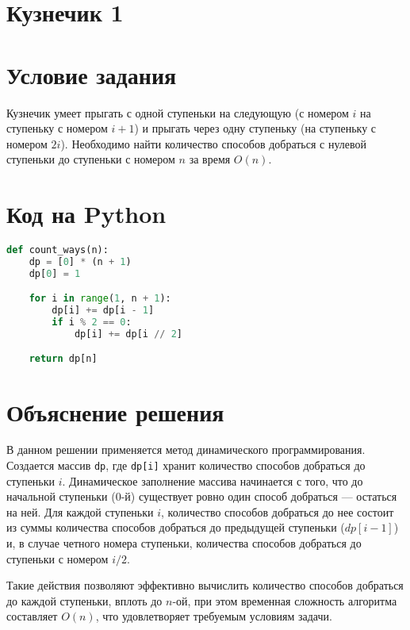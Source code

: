 \section*{Кузнечик 1}

\section*{Условие задания}

Кузнечик умеет прыгать с одной ступеньки на следующую (с номером \(i\) на ступеньку с номером \(i+1\)) и прыгать через одну ступеньку (на ступеньку с номером \(2i\)). Необходимо найти количество способов добраться с нулевой ступеньки до ступеньки с номером \(n\) за время \(O(n)\).

\section*{Код на Python}

\begin{lstlisting}[language=Python]
def count_ways(n):
    dp = [0] * (n + 1)  
    dp[0] = 1

    for i in range(1, n + 1):
        dp[i] += dp[i - 1]
        if i % 2 == 0:
            dp[i] += dp[i // 2]

    return dp[n]
\end{lstlisting}

\section*{Объяснение решения}

В данном решении применяется метод динамического программирования. Создается массив \texttt{dp}, где \texttt{dp[i]} хранит количество способов добраться до ступеньки \(i\). Динамическое заполнение массива начинается с того, что до начальной ступеньки (0-й) существует ровно один способ добраться — остаться на ней. Для каждой ступеньки \(i\), количество способов добраться до нее состоит из суммы количества способов добраться до предыдущей ступеньки (\(dp[i-1]\)) и, в случае четного номера ступеньки, количества способов добраться до ступеньки с номером \(i/2\).

Такие действия позволяют эффективно вычислить количество способов добраться до каждой ступеньки, вплоть до \(n\)-ой, при этом временная сложность алгоритма составляет \(O(n)\), что удовлетворяет требуемым условиям задачи.